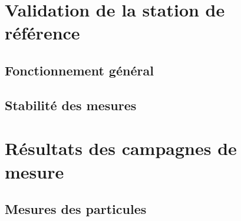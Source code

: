 


\section{Validation de la station de référence}

\subsection{Fonctionnement général}

\subsection{Stabilité des mesures}

\section{Résultats des campagnes de mesure}

\subsection{Mesures des particules}

